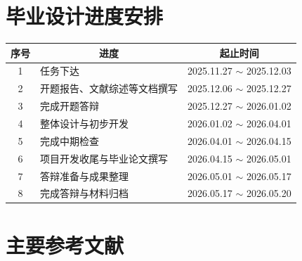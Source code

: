 \section{毕业设计进度安排}
\begin{table}[!htbp]
	\centering
	\vspace{-2ex}
	\small%
	\begin{tabular}{cp{25em}p{10.5em}}
		\toprule
		\textbf{序号} & \multicolumn{1}{c}{\textbf{进度}} & \multicolumn{1}{c}{\textbf{起止时间}} \\
		\midrule
		1           & 任务下达                          & 2025.11.27 $\sim$ 2025.12.03      \\
		2           & 开题报告、文献综述等文档撰写      & 2025.12.06 $\sim$ 2025.12.27      \\
		3           & 完成开题答辩                      & 2025.12.27 $\sim$ 2026.01.02      \\
		4           & 整体设计与初步开发                & 2026.01.02 $\sim$ 2026.04.01      \\
		5           & 完成中期检查                      & 2026.04.01 $\sim$ 2026.04.15      \\
		6           & 项目开发收尾与毕业论文撰写        & 2026.04.15 $\sim$ 2026.05.01      \\
		7           & 答辩准备与成果整理                & 2026.05.01 $\sim$ 2026.05.17      \\
		8           & 完成答辩与材料归档                & 2026.05.17 $\sim$ 2026.05.20      \\
		\bottomrule
	\end{tabular}
	\vspace{-2ex}
\end{table}

\section{主要参考文献}